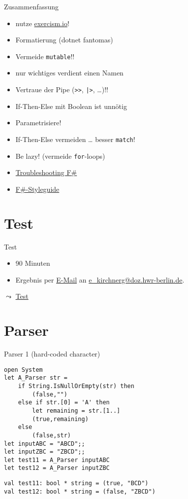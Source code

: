 \documentclass[t]{beamer}
\begin{document}
\begin{frame}[label={sec:org48530c4},fragile]{Zusammenfassung}
 \begin{itemize}
\item nutze \href{https://exercism.io}{exercism.io}!
\item Formatierung (dotnet fantomas)
\item Vermeide \texttt{mutable}!!
\item nur wichtiges verdient einen Namen
\item Vertraue der \alert{Pipe} (\texttt{>>}, \texttt{|>}, \ldots{})!!
\item If-Then-Else mit Boolean ist unnötig
\item Parametrisiere!
\item If-Then-Else vermeiden \ldots{} besser \texttt{match}!
\item Be lazy! (vermeide \texttt{for}-loops)
\item \href{https://fsharpforfunandprofit.com/troubleshooting-fsharp/}{Troubleshooting F\#}
\item \href{https://docs.microsoft.com/de-de/dotnet/fsharp/style-guide/}{F\#-Styleguide}
\end{itemize}
\end{frame}

\section{Test }
\label{sec:org3061079}
\begin{frame}[label={sec:orgd6d78e6}]{Test}
\begin{itemize}
\item 90 Minuten
\item Ergebnis per \href{mailto://e\_kirchnerg@doz.hwr-berlin.de}{E-Mail} an \href{mailto://e\_kirchnerg@doz.hwr-berlin.de}{e\_kirchnerg@doz.hwr-berlin.de}.
\end{itemize}

\(\leadsto\) \href{../src/5/test.md}{Test}
\end{frame}

\section{Parser }
\label{sec:org0caa37e}
\begin{frame}[label={sec:orga6ffe1c},fragile]{Parser 1 (hard-coded character)}
 \begin{verbatim}
open System
let A_Parser str =
    if String.IsNullOrEmpty(str) then
        (false,"")
    else if str.[0] = 'A' then
        let remaining = str.[1..]
        (true,remaining)
    else
        (false,str)
let inputABC = "ABCD";;
let inputZBC = "ZBCD";;
let test11 = A_Parser inputABC
let test12 = A_Parser inputZBC
\end{verbatim}

\begin{verbatim}
val test11: bool * string = (true, "BCD")
val test12: bool * string = (false, "ZBCD")
\end{verbatim}
\end{frame}
\end{document}
